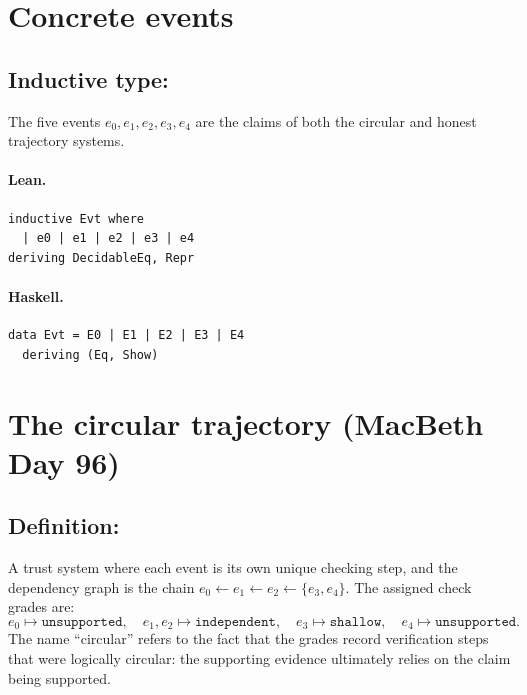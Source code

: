 \documentclass[11pt,a4paper]{article}
\begin{document}
\section{Concrete events}

\subsection{Inductive type: }

\begin{defn}[Events]
The five events $e_0, e_1, e_2, e_3, e_4$ are the claims of both the circular
and honest trajectory systems.
\end{defn}

\paragraph{Lean.}
\begin{lstlisting}[style=lean]
inductive Evt where
  | e0 | e1 | e2 | e3 | e4
deriving DecidableEq, Repr
\end{lstlisting}

\paragraph{Haskell.}
\begin{lstlisting}[style=haskell]
data Evt = E0 | E1 | E2 | E3 | E4
  deriving (Eq, Show)
\end{lstlisting}

\section{The circular trajectory (MacBeth Day 96)}

\subsection{Definition: }

\begin{defn}
A trust system  where each event is its own unique
checking step, and the dependency graph is the chain
$e_0 \leftarrow e_1 \leftarrow e_2 \leftarrow \{e_3, e_4\}$.
The assigned check grades are:
\[
  e_0 \mapsto \mathtt{unsupported},\quad
  e_1, e_2 \mapsto \mathtt{independent},\quad
  e_3 \mapsto \mathtt{shallow},\quad
  e_4 \mapsto \mathtt{unsupported}.
\]
The name ``circular'' refers to the fact that the grades record verification
steps that were logically circular: the supporting evidence ultimately relies
on the claim being supported.
\end{defn}
\end{document}
